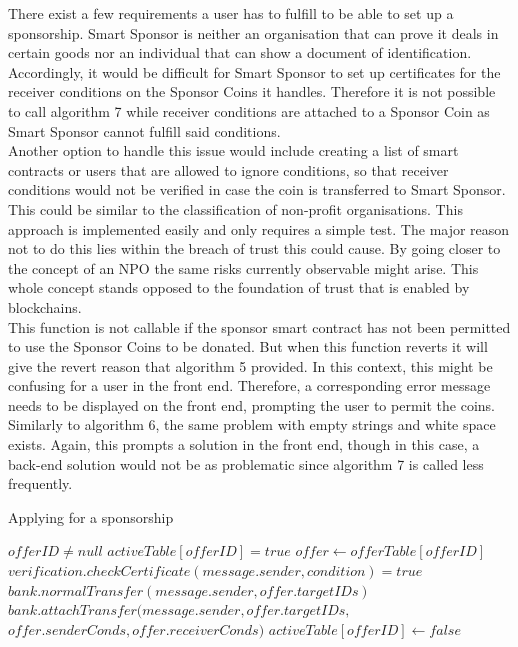 There exist a few requirements a user has to fulfill to be able to set up a sponsorship. Smart Sponsor is neither an organisation that can prove it deals in certain goods nor an individual that can show a document of identification. Accordingly, it would be difficult for Smart Sponsor to set up certificates for the receiver conditions on the Sponsor Coins it handles. Therefore it is not possible to call algorithm 7 while receiver conditions are attached to a Sponsor Coin as Smart Sponsor cannot fulfill said conditions.\\
Another option to handle this issue would include creating a list of smart contracts or users that are allowed to ignore conditions, so that receiver conditions would not be verified in case the coin is transferred to Smart Sponsor. This could be similar to the classification of non-profit organisations. This approach is implemented easily and only requires a simple test. The major reason not to do this lies within the breach of trust this could cause. By going closer to the concept of an NPO the same risks currently observable might arise. This whole concept stands opposed to the foundation of trust that is enabled by blockchains.\\
This function is not callable if the sponsor smart contract has not been permitted to use the Sponsor Coins to be donated. But when this function reverts it will give the revert reason that algorithm 5 provided. In this context, this might be confusing for a user in the front end. Therefore, a corresponding error message needs to be displayed on the front end, prompting the user to permit the coins.\\
Similarly to algorithm 6, the same problem with empty strings and white space exists. Again, this prompts a solution in the front end, though in this case, a back-end solution would not be as problematic since algorithm 7 is called less frequently.
\begin{algorithm}
\caption{Applying for a sponsorship}\label{alg:applyOffer}
\begin{algorithmic}
\Require $offerID \neq null$
\Require $activeTable[offerID] = true$
\State $offer \gets offerTable[offerID]$
\Ensure $verification.checkCertificate(message.sender,condition) = true$
\EndFor
{}\\
\hspace{30pt}$bank.normalTransfer(message.sender, offer.targetIDs)$
\Else\\
\hspace{30pt}$bank.attachTransfer(message.sender, offer.targetIDs,$\\
\hspace{130pt}$offer.senderConds, offer.receiverConds)$
\EndIf
\State $activeTable[offerID] \gets false$
\end{algorithmic}
\end{algorithm}
